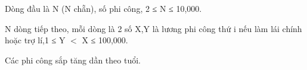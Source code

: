 Dòng đầu là N (N chẵn), số phi công, 2 ≤ N ≤ 10,000.  

   N dòng tiếp theo, mỗi dòng là 2 số X,Y là lương phi công thứ i nếu làm lái chính hoặc trợ lí,1 ≤ Y $<$ X ≤ 100,000.  

   Các phi công sắp tăng dần theo tuổi.  



\